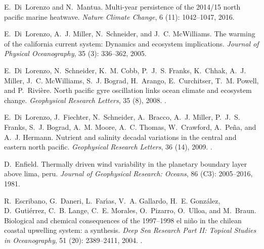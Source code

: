 \documentclass[hvmath, online,bgd]{copernicus_discussions}
\begin{document}
\begin{thebibliography}{84}
	E.~Di~Lorenzo and N.~Mantua.
	\newblock Multi-year persistence of the 2014/15 north pacific marine heatwave.
	\newblock \emph{Nature Climate Change}, 6 (11): 1042--1047,
	2016.
	
	E.~Di~Lorenzo, A.~J. Miller, N.~Schneider, and J.~C. McWilliams.
	\newblock The warming of the california current system: Dynamics and ecosystem
	implications.
	\newblock \emph{Journal of Physical Oceanography}, 35 (3):
	336--362, 2005.
	
	E.~Di~Lorenzo, N.~Schneider, K.~M. Cobb, P.~J.~S. Franks, K.~Chhak, A.~J.
	Miller, J.~C. McWilliams, S.~J. Bograd, H.~Arango, E.~Curchitser, T.~M.
	Powell, and P.~Rivi{\`e}re.
	\newblock North pacific gyre oscillation links ocean climate and ecosystem
	change.
	\newblock \emph{Geophysical Research Letters}, 35 (8), 2008.
	\newblock {}.
	
	E.~Di~Lorenzo, J.~Fiechter, N.~Schneider, A.~Bracco, A.~J. Miller, P.~J.~S.
	Franks, S.~J. Bograd, A.~M. Moore, A.~C. Thomas, W.~Crawford, A.~Pe{\~n}a,
	and A.~J. Hermann.
	\newblock Nutrient and salinity decadal variations in the central and eastern
	north pacific.
	\newblock \emph{Geophysical Research Letters}, 36 (14), 2009.
	\newblock {}.
	
	D.~Enfield.
	\newblock Thermally driven wind variability in the planetary boundary layer
	above lima, peru.
	\newblock \emph{Journal of Geophysical Research: Oceans}, 86
	(C3): 2005--2016, 1981.
	
	R.~Escribano, G.~Daneri, L.~Far{\'\i}as, V.~A. Gallardo, H.~E. Gonz{\'a}lez,
	D.~Guti{\'e}rrez, C.~B. Lange, C.~E. Morales, O.~Pizarro, O.~Ulloa, and
	M.~Braun.
	\newblock Biological and chemical consequences of the 1997--1998 el ni{\~n}o in
	the chilean coastal upwelling system: a synthesis.
	\newblock \emph{Deep Sea Research Part II: Topical Studies in Oceanography},
	51 (20): 2389--2411, 2004.
	\newblock {}.
	

\end{thebibliography}
\end{document}
